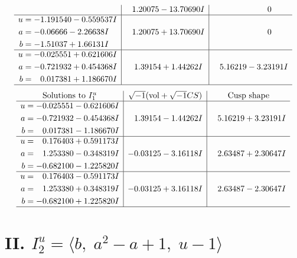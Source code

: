 \documentclass[1p]{elsarticle_modified}
\theoremstyle{definition}
\newcommand{\I}{\sqrt{-1}}
\begin{document}
$$\begin{array}{c|c|c}
 & \phantom{-}1.20075 - 13.70690 I & \phantom{-0.000000 } 0 \\ \hline\begin{aligned}
u &= -1.191540 - 0.559537 I \\
a &= -0.06666 - 2.26638 I \\
b &= -1.51037 + 1.66131 I\end{aligned}
 & \phantom{-}1.20075 + 13.70690 I & \phantom{-0.000000 } 0 \\ \hline\begin{aligned}
u &= -0.025551 + 0.621606 I \\
a &= -0.721932 + 0.454368 I \\
b &= \phantom{-}0.017381 + 1.186670 I\end{aligned}
 & \phantom{-}1.39154 + 1.44262 I & \phantom{-}5.16219 - 3.23191 I\\
 \hline 
 \end{array}$$\newpage$$\begin{array}{c|c|c}  
\text{Solutions to }I^u_{1}& \I (\text{vol} + \sqrt{-1}CS) & \text{Cusp shape}\\
 \hline 
\begin{aligned}
u &= -0.025551 - 0.621606 I \\
a &= -0.721932 - 0.454368 I \\
b &= \phantom{-}0.017381 - 1.186670 I\end{aligned}
 & \phantom{-}1.39154 - 1.44262 I & \phantom{-}5.16219 + 3.23191 I \\ \hline\begin{aligned}
u &= \phantom{-}0.176403 + 0.591173 I \\
a &= \phantom{-}1.253380 - 0.348319 I \\
b &= -0.682100 - 1.225820 I\end{aligned}
 & -0.03125 - 3.16118 I & \phantom{-}2.63487 + 2.30647 I \\ \hline\begin{aligned}
u &= \phantom{-}0.176403 - 0.591173 I \\
a &= \phantom{-}1.253380 + 0.348319 I \\
b &= -0.682100 + 1.225820 I\end{aligned}
 & -0.03125 + 3.16118 I & \phantom{-}2.63487 - 2.30647 I\\
 \hline 
 \end{array}$$\newpage\newpage\renewcommand{\arraystretch}{1}
\centering \section*{II. $I^u_{2}= \langle b,\;a^2- a+1,\;u-1 \rangle$}
\end{document}
